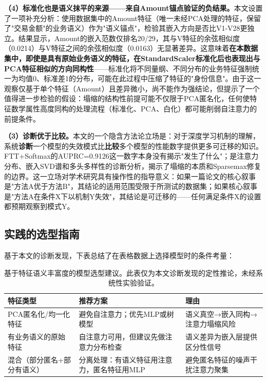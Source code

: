 \textbf{（4）标准化也是语义抹平的来源——来自Amount锚点验证的负结果。}本文设置了一项补充分析：使用数据集中的Amount特征（唯一未经PCA处理的特征，保留了"交易金额"的业务语义）作为"语义锚点"，检验其嵌入方向是否比V1-V28更独立。结果显示，Amount的嵌入范数仅排名20/29，其与V特征的余弦相似度（0.0214）与V特征之间的余弦相似度（0.0163）无显著差异。这意味着\textbf{在本数据集中，即使是具有原始业务语义的特征，在StandardScaler标准化后也表现出与PCA特征相似的方向同构性}——标准化将不同量纲、不同分布的业务特征强制统一为均值0、标准差1的分布，可能在此过程中压缩了特征的"身份信息"。由于这一观察仅基于单个特征（Amount）且差异微小，尚不能作为强结论，但提示了一个值得进一步检验的假设：塌缩的结构性前提可能不仅限于PCA匿名化，任何使特征数学属性高度同构的处理流程（标准化、PCA、白化）都可能削弱自注意力的前提条件。

\textbf{（3）诊断优于比较。}本文的一个隐含方法论立场是：对于深度学习机制的理解，系统\textbf{诊断}一个模型的失效模式比\textbf{比较}多个模型的性能数字提供更多可迁移的知识。FTT+Softmax的AUPRC=0.9126这一数字本身没有揭示"发生了什么"；是注意力分布、嵌入SVD谱和多头多样性的诊断分析，揭示了塌缩的本质和Sparsemax修复的边界。这一立场对学术研究具有操作性的指导意义：如果一篇论文的核心叙事是"方法A优于方法B"，其结论的适用范围受限于所测试的数据集；如果核心叙事是"方法A在条件X下以机制Y失效"，其结论是可迁移的——任何满足条件X的设置都预期观察到模式Y。

\subsection{实践的选型指南}

基于本文的诊断发现，下表总结了在表格数据上选择模型时的条件考量：

\begin{table}[htbp]
\centering
\caption{基于特征语义丰富度的模型选型建议。此表仅为本文诊断发现的定性推论，未经系统性实验验证。}
\label{tab:selection_guide}
\begin{tabular}{p{3.5cm}p{5.5cm}p{5cm}}
\toprule
\textbf{特征类型} & \textbf{推荐方案} & \textbf{理由} \\
\midrule
PCA匿名化/均一化特征 & 避免自注意力；优先MLP或树模型 & 语义真空→嵌入同构→注意力塌缩风险 \\
有业务语义的原始特征 & 自注意力可用，但建议先做注意力分布检查 & 语义差异为嵌入层提供区分性信号 \\
混合（部分匿名+部分有语义） & 分离处理：有语义特征用注意力，匿名特征用MLP & 避免匿名特征的噪声干扰注意力聚集 \\
\bottomrule
\end{tabular}
\end{table}

